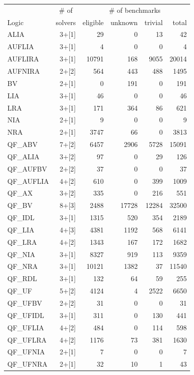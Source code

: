 \documentclass[twoside,11pt]{article}
\begin{document}
\begin{table}
\centering
\begin{tabular}{|l|r|r|r|r|r|}
\hline
       & \multicolumn{1}{|c|}{\# of} & \multicolumn{4}{|c|}{\# of benchmarks} \\
 Logic & solvers & eligible & unknown  & trivial  & total  \\
\hline
ALIA & 3+[1] & 29 & 0 & 13 & 42 \\
AUFLIA & 3+[1] & 4 & 0 & 0 & 4\\
AUFLIRA & 3+[1] & 10791 & 168 & 9055 & 20014 \\
AUFNIRA & 2+[2] & 564 & 443 & 488 & 1495 \\
BV & 2+[1] & 0 & 191 & 0 & 191 \\
LIA & 3+[1] & 46 & 0 & 0 & 46 \\
LRA & 3+[1] & 171 & 364 & 86 & 621\\
NIA & 2+[1] & 9 & 0 & 0 & 9\\
NRA & 2+[1] & 3747 & 66 & 0 & 3813 \\
QF\_ABV & 7+[2] & 6457 & 2906 & 5728 & 15091 \\
QF\_ALIA & 3+[2] & 97 & 0 & 29 & 126 \\
QF\_AUFBV & 2+[2] & 37 & 0 & 0 & 37 \\
QF\_AUFLIA & 4+[2] & 610 & 0 & 399 & 1009\\
QF\_AX & 3+[2] & 335 & 0 & 216 & 551 \\
QF\_BV & 8+[3] & 2488 & 17728 & 12284 & 32500 \\
QF\_IDL & 3+[1] & 1315 & 520 & 354 & 2189 \\
QF\_LIA & 4+[3] & 4381 & 1192 & 568 & 6141 \\
QF\_LRA & 4+[2] & 1343 & 167 & 172 & 1682\\ 
QF\_NIA & 3+[1] & 8327 & 919 & 113 & 9359 \\
QF\_NRA & 3+[1] & 10121 & 1382 & 37 & 11540 \\
QF\_RDL & 3+[1] & 132 & 64 & 59 & 255 \\
QF\_UF & 5+[2] & 4124 & 4 & 2522 & 6650 \\
QF\_UFBV & 2+[2] & 31 & 0 & 0 & 31 \\
QF\_UFIDL & 3+[1] & 311 & 0 & 130 & 441\\
QF\_UFLIA & 4+[2] & 484 & 0 & 114 & 598 \\
QF\_UFLRA & 4+[2] & 1176 & 73 & 381 & 1630 \\
QF\_UFNIA & 2+[1] & 7 & 0 &0 & 7 \\
QF\_UFNRA & 2+[1] & 32 & 10 & 1 & 43\\

\end{tabular}
\end{table}
\end{document}
